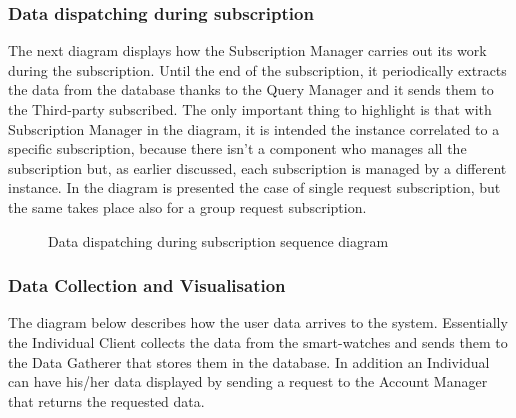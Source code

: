 \subsubsection{Data dispatching during subscription}
The next diagram displays how the Subscription Manager carries out its work during the subscription. Until the end of the subscription, it periodically extracts the data from the database thanks to the Query Manager and it sends them to the Third-party subscribed. The only important thing to highlight is that with Subscription Manager in the diagram, it is intended the instance correlated to a specific subscription, because there isn't a component who manages all the subscription but, as earlier discussed, each subscription is managed by a different instance.
In the diagram is presented the case of single request subscription, but the same takes place also for a group request subscription.

\begin{figure}[H]
    \centering
    \caption{Data dispatching during subscription sequence diagram}
    \label{fig:log&regDiagram}
\end{figure}

\subsubsection{Data Collection and Visualisation}
The diagram below describes how the user data arrives to the system.
Essentially the Individual Client collects the data from the smart-watches and sends them to the Data Gatherer that stores them in the database.
In addition an Individual can have his/her data displayed by sending a request to the Account Manager that returns the requested data.

